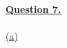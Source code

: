 \documentclass[12pt]{article}
\begin{document}
\hyperlink{toc}{\LARGE \underline{\textbf{Question 7.}}}\\
~\\\hyperlink{toc}{\hypertarget{7.1}{(a)}}\\
%
%
\end{document}
